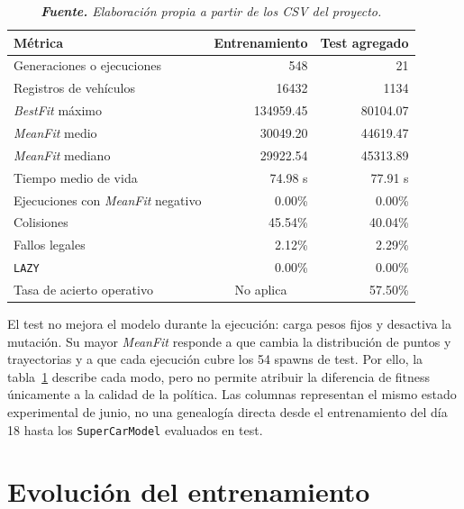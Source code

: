 \begin{table}[H]
\centering
\caption{Resultados principales del entrenamiento y del bloque de test del 18 de junio de 2026.}%
\label{tab:resultados-principales}
\begin{tabular}{lrr}
\toprule
\textbf{Métrica} & \textbf{Entrenamiento} & \textbf{Test agregado}\\
\midrule
Generaciones o ejecuciones & 548 & 21\\
Registros de vehículos & 16432 & 1134\\
\textit{BestFit} máximo & 134959.45 & 80104.07\\
\textit{MeanFit} medio & 30049.20 & 44619.47\\
\textit{MeanFit} mediano & 29922.54 & 45313.89\\
Tiempo medio de vida & 74.98 s & 77.91 s\\
Ejecuciones con \textit{MeanFit} negativo & 0.00\% & 0.00\%\\
Colisiones & 45.54\% & 40.04\%\\
Fallos legales & 2.12\% & 2.29\%\\
\texttt{LAZY} & 0.00\% & 0.00\%\\
Tasa de acierto operativo & \multicolumn{1}{c}{No aplica} & 57.50\%\\
\bottomrule
\end{tabular}
\caption*{\textit{\textbf{Fuente.} Elaboración propia a partir de los CSV del proyecto.}}
\end{table}

El test no mejora el modelo durante la ejecución: carga pesos fijos y desactiva la mutación. Su mayor \textit{MeanFit} responde a que cambia la distribución de puntos y trayectorias y a que cada ejecución cubre los 54 spawns de test. Por ello, la tabla~\ref{tab:resultados-principales} describe cada modo, pero no permite atribuir la diferencia de fitness únicamente a la calidad de la política. Las columnas representan el mismo estado experimental de junio, no una genealogía directa desde el entrenamiento del día 18 hasta los \texttt{SuperCarModel} evaluados en test.

\clearpage
\section{Evolución del entrenamiento}

